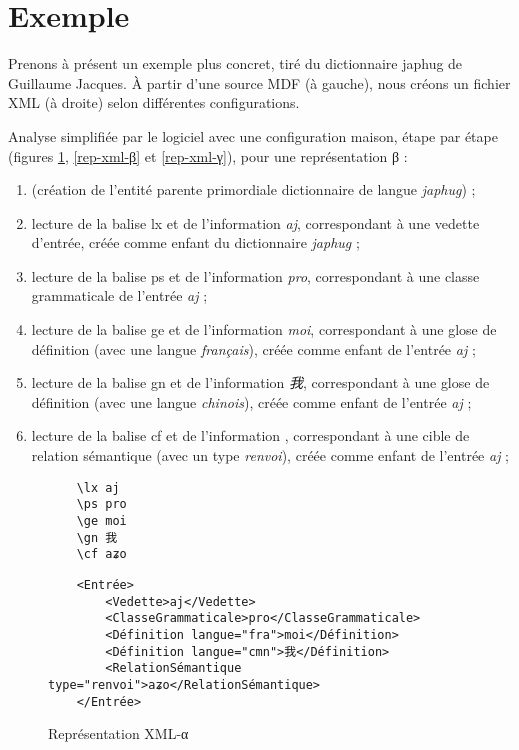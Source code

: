 \documentclass[10pt]{report}
\newcommand{\balise}[1]{\textcolor{red!80}{#1}}
\newcommand{\entité}[1]{\textcolor{blue!80!black}{#1}}
\newcommand{\caractéristique}[1]{\textcolor{green!60!black}{#1}}
\begin{document}
\section{Exemple}

Prenons à présent un exemple plus concret, tiré du dictionnaire japhug de Guillaume Jacques. À partir d’une source MDF (à gauche), nous créons un fichier XML (à droite) selon différentes configurations.

Analyse simplifiée par le logiciel avec une configuration maison, étape par étape (figures \ref{rep-xml-α}, \ref{rep-xml-β} et \ref{rep-xml-γ}), pour une représentation β :

\begin{enumerate}
	\item (création de l’entité parente primordiale \entité{dictionnaire} de \caractéristique{langue} \textit{japhug}) ;
	\item lecture de la balise \balise{lx} et de l’information \textit{aj}, correspondant à une \caractéristique{vedette} d’\entité{entrée}, créée comme enfant du \entité{dictionnaire} \textit{japhug} ;
	\item lecture de la balise \balise{ps} et de l’information \textit{pro}, correspondant à une \caractéristique{classe grammaticale} de l’\entité{entrée} \textit{aj} ;
	\item lecture de la balise \balise{ge} et de l’information \textit{moi}, correspondant à une \caractéristique{glose} de \entité{définition} (avec une \caractéristique{langue} \textit{français}), créée comme enfant de l’\entité{entrée} \textit{aj} ;
	\item lecture de la balise \balise{gn} et de l’information \textit{我}, correspondant à une \caractéristique{glose} de \entité{définition} (avec une \caractéristique{langue} \textit{chinois}), créée comme enfant de l’\entité{entrée} \textit{aj} ;
	\item lecture de la balise \balise{cf} et de l’information \textit{}, correspondant à une \caractéristique{cible} de \entité{relation sémantique} (avec un \caractéristique{type} \textit{renvoi}), créée comme enfant de l’\entité{entrée} \textit{aj} ;
\end{enumerate}

\begin{figure}[H]
	\centering
	\begin{minipage}{0.2\linewidth}
    \begin{verbatim}
    \lx aj
    \ps pro
    \ge moi
    \gn 我
    \cf aʑo
    \end{verbatim}
	\end{minipage}%
	\begin{minipage}{0.8\linewidth}
    \begin{verbatim}
    <Entrée>
        <Vedette>aj</Vedette>
        <ClasseGrammaticale>pro</ClasseGrammaticale>
        <Définition langue="fra">moi</Définition>
        <Définition langue="cmn">我</Définition>
        <RelationSémantique type="renvoi">aʑo</RelationSémantique>
    </Entrée>
    \end{verbatim}	
	\end{minipage}
	\caption{Représentation XML-α}
	\label{rep-xml-α}
\end{figure}
\end{document}
